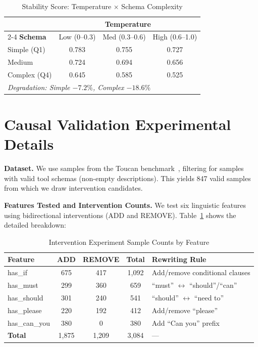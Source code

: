 \documentclass[sigconf,anonymous,review]{acmart}
\begin{document}
\begin{table}[h]
\centering
\caption{Stability Score: Temperature $\times$ Schema Complexity}
\small
\begin{tabular}{@{}lccc@{}}
\toprule
& \multicolumn{3}{c}{\textbf{Temperature}} \\
\cmidrule(l){2-4}
\textbf{Schema} & Low (0--0.3) & Med (0.3--0.6) & High (0.6--1.0) \\
\midrule
Simple (Q1) & 0.783 & 0.755 & 0.727 \\
Medium & 0.724 & 0.694 & 0.656 \\
Complex (Q4) & 0.645 & 0.585 & 0.525 \\
\midrule
\multicolumn{4}{l}{\textit{Degradation: Simple $-7.2\%$, Complex $-18.6\%$}} \\
\bottomrule
\end{tabular}
\end{table}

\section{Causal Validation Experimental Details}
\label{app:causal_details}

\textbf{Dataset.} We use samples from the Toucan benchmark~\cite{toucan2025}, filtering for samples with valid tool schemas (non-empty descriptions). This yields 847 valid samples from which we draw intervention candidates.

\textbf{Features Tested and Intervention Counts.} We test six linguistic features using bidirectional interventions (ADD and REMOVE). Table~\ref{tab:intervention_counts} shows the detailed breakdown:

\begin{table}[h]
\centering
\caption{Intervention Experiment Sample Counts by Feature}
\label{tab:intervention_counts}
\small
\begin{tabular}{@{}lcccp{4cm}@{}}
\toprule
\textbf{Feature} & \textbf{ADD} & \textbf{REMOVE} & \textbf{Total} & \textbf{Rewriting Rule} \\
\midrule
has\_if & 675 & 417 & 1,092 & Add/remove conditional clauses \\
has\_must & 299 & 360 & 659 & ``must'' $\leftrightarrow$ ``should''/``can'' \\
has\_should & 301 & 240 & 541 & ``should'' $\leftrightarrow$ ``need to'' \\
has\_please & 220 & 192 & 412 & Add/remove ``please'' \\
has\_can\_you & 380 & 0 & 380 & Add ``Can you'' prefix \\
\midrule
\textbf{Total} & 1,875 & 1,209 & 3,084 & --- \\
\bottomrule
\end{tabular}
\end{table}
\end{document}
